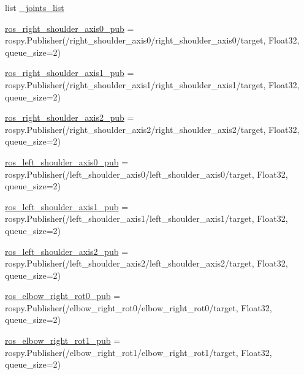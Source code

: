 \begin{DoxyCompactItemize}
\item 
list \mbox{\hyperlink{namespacesteering__test_ac23c542879ae4481b03fabe24ff9f3a4}{\+\_\+joints\+\_\+list}}
\item 
\mbox{\hyperlink{namespacesteering__test_ad9cd1bfdf6fe43226b7aff6baf0792bf}{ros\+\_\+right\+\_\+shoulder\+\_\+axis0\+\_\+pub}} = rospy.\+Publisher(\textquotesingle{}/right\+\_\+shoulder\+\_\+axis0/right\+\_\+shoulder\+\_\+axis0/target\textquotesingle{}, Float32, queue\+\_\+size=2)
\item 
\mbox{\hyperlink{namespacesteering__test_a1a0627242a5f210e5e35b81aa44ace87}{ros\+\_\+right\+\_\+shoulder\+\_\+axis1\+\_\+pub}} = rospy.\+Publisher(\textquotesingle{}/right\+\_\+shoulder\+\_\+axis1/right\+\_\+shoulder\+\_\+axis1/target\textquotesingle{}, Float32, queue\+\_\+size=2)
\item 
\mbox{\hyperlink{namespacesteering__test_a5ec29f49e4b6de223ae73a43e4b81bab}{ros\+\_\+right\+\_\+shoulder\+\_\+axis2\+\_\+pub}} = rospy.\+Publisher(\textquotesingle{}/right\+\_\+shoulder\+\_\+axis2/right\+\_\+shoulder\+\_\+axis2/target\textquotesingle{}, Float32, queue\+\_\+size=2)
\item 
\mbox{\hyperlink{namespacesteering__test_ae45c5456e93c7c274ef55e0430768eac}{ros\+\_\+left\+\_\+shoulder\+\_\+axis0\+\_\+pub}} = rospy.\+Publisher(\textquotesingle{}/left\+\_\+shoulder\+\_\+axis0/left\+\_\+shoulder\+\_\+axis0/target\textquotesingle{}, Float32, queue\+\_\+size=2)
\item 
\mbox{\hyperlink{namespacesteering__test_a736f11c141c4261badff3b3d5508e14a}{ros\+\_\+left\+\_\+shoulder\+\_\+axis1\+\_\+pub}} = rospy.\+Publisher(\textquotesingle{}/left\+\_\+shoulder\+\_\+axis1/left\+\_\+shoulder\+\_\+axis1/target\textquotesingle{}, Float32, queue\+\_\+size=2)
\item 
\mbox{\hyperlink{namespacesteering__test_ad1539c0499eb48f16aa4670176c5d2cd}{ros\+\_\+left\+\_\+shoulder\+\_\+axis2\+\_\+pub}} = rospy.\+Publisher(\textquotesingle{}/left\+\_\+shoulder\+\_\+axis2/left\+\_\+shoulder\+\_\+axis2/target\textquotesingle{}, Float32, queue\+\_\+size=2)
\item 
\mbox{\hyperlink{namespacesteering__test_a8b72aa5250d03bc64a0ae00f7fb94e45}{ros\+\_\+elbow\+\_\+right\+\_\+rot0\+\_\+pub}} = rospy.\+Publisher(\textquotesingle{}/elbow\+\_\+right\+\_\+rot0/elbow\+\_\+right\+\_\+rot0/target\textquotesingle{}, Float32, queue\+\_\+size=2)
\item 
\mbox{\hyperlink{namespacesteering__test_a532f906db02af05139ac166f139dcea7}{ros\+\_\+elbow\+\_\+right\+\_\+rot1\+\_\+pub}} = rospy.\+Publisher(\textquotesingle{}/elbow\+\_\+right\+\_\+rot1/elbow\+\_\+right\+\_\+rot1/target\textquotesingle{}, Float32, queue\+\_\+size=2)

\end{DoxyCompactItemize}
